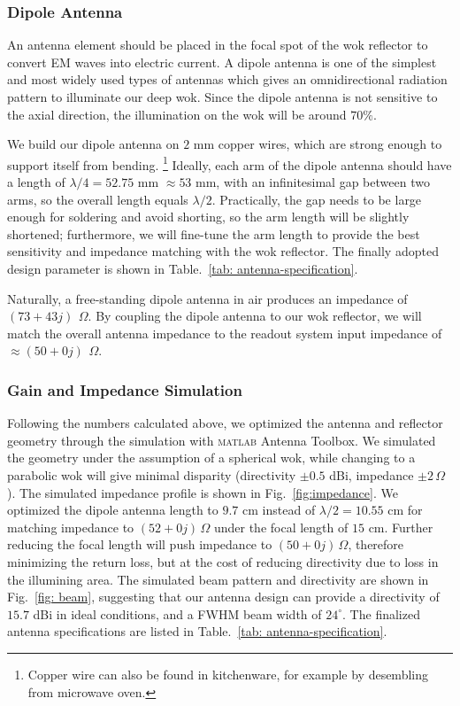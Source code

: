 \documentclass[12pt]{article}
\begin{document}
   \subsubsection{Dipole Antenna}
    An antenna element should be placed in the focal spot of the wok reflector to convert EM waves into electric current. A dipole antenna is one of the simplest and most widely used types of antennas which gives an omnidirectional radiation pattern to illuminate our deep wok. Since the dipole antenna is not sensitive to the axial direction, the illumination on the wok will be around $70\%$. 

    We build our dipole antenna on $2$ mm copper wires, which are strong enough to support itself from bending.%
    \footnote{Copper wire can also be found in kitchenware, for example by desembling from microwave oven.} 
    Ideally, each arm of the dipole antenna should have a length of $\lambda/4 = 52.75$ mm $\approx 53$ mm, with an infinitesimal gap between two arms, so the overall length equals $\lambda/2$. Practically, the gap needs to be large enough for soldering and avoid shorting, so the arm length will be slightly shortened; furthermore, we will fine-tune the arm length to provide the best sensitivity and impedance matching with the wok reflector. 
    The finally adopted design parameter is shown in Table.~\ref{tab: antenna-specification}.
    
    Naturally, a free-standing dipole antenna in air produces an impedance of $(73+43j)\ \, \Omega$. By coupling the dipole antenna to our wok reflector, we will match the overall antenna impedance to the readout system input impedance of $\approx (50+0j)\ \, \Omega$.
    
    \subsubsection{Gain and Impedance Simulation} \label{sect: gain-simulation}
    Following the numbers calculated above, we optimized the antenna and reflector geometry through the simulation with \textsc{matlab} Antenna Toolbox. We simulated the geometry under the assumption of a spherical wok, while changing to a parabolic wok will give minimal disparity (directivity $\pm 0.5$ dBi, impedance $\pm 2 \, \Omega$). 
    The simulated impedance profile is shown in Fig.~\ref{fig:impedance}. We optimized the dipole antenna length to $9.7$ cm instead of $\lambda/2 = 10.55$ cm for matching impedance to $(52+0j)\, \Omega$ under the focal length of $15$ cm. 
    Further reducing the focal length will push impedance to $(50+0j)\, \Omega$, therefore minimizing the return loss, but at the cost of reducing directivity due to loss in the illumining area. 
    The simulated beam pattern and directivity are shown in Fig.~\ref{fig: beam}, suggesting that our antenna design can provide a directivity of $15.7$ dBi in ideal conditions, and a FWHM beam width of $24^\circ$. The finalized antenna specifications are listed in Table.~\ref{tab: antenna-specification}.
\end{document}
